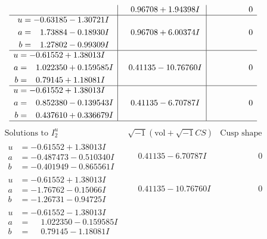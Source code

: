 \documentclass[1p]{elsarticle_modified}
\theoremstyle{definition}
\newcommand{\I}{\sqrt{-1}}
\begin{document}
$$\begin{array}{c|c|c}
 & \phantom{-}0.96708 + 1.94398 I & \phantom{-0.000000 } 0 \\ \hline\begin{aligned}
u &= -0.63185 - 1.30721 I \\
a &= \phantom{-}1.73884 - 0.18930 I \\
b &= \phantom{-}1.27802 - 0.99309 I\end{aligned}
 & \phantom{-}0.96708 + 6.00374 I & \phantom{-0.000000 } 0 \\ \hline\begin{aligned}
u &= -0.61552 + 1.38013 I \\
a &= \phantom{-}1.022350 + 0.159585 I \\
b &= \phantom{-}0.79145 + 1.18081 I\end{aligned}
 & \phantom{-}0.41135 - 10.76760 I & \phantom{-0.000000 } 0 \\ \hline\begin{aligned}
u &= -0.61552 + 1.38013 I \\
a &= \phantom{-}0.852380 - 0.139543 I \\
b &= \phantom{-}0.437610 + 0.336679 I\end{aligned}
 & \phantom{-}0.41135 - 6.70787 I & \phantom{-0.000000 } 0\\
 \hline 
 \end{array}$$\newpage$$\begin{array}{c|c|c}  
\text{Solutions to }I^u_{2}& \I (\text{vol} + \sqrt{-1}CS) & \text{Cusp shape}\\
 \hline 
\begin{aligned}
u &= -0.61552 + 1.38013 I \\
a &= -0.487473 - 0.510340 I \\
b &= -0.401949 - 0.865561 I\end{aligned}
 & \phantom{-}0.41135 - 6.70787 I & \phantom{-0.000000 } 0 \\ \hline\begin{aligned}
u &= -0.61552 + 1.38013 I \\
a &= -1.76762 - 0.15066 I \\
b &= -1.26731 - 0.94725 I\end{aligned}
 & \phantom{-}0.41135 - 10.76760 I & \phantom{-0.000000 } 0 \\ \hline\begin{aligned}
u &= -0.61552 - 1.38013 I \\
a &= \phantom{-}1.022350 - 0.159585 I \\
b &= \phantom{-}0.79145 - 1.18081 I\end{aligned}

\end{array}$$
\end{document}
